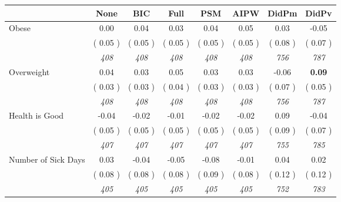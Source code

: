 \begin{tabular}{l c c c c c c c}
\toprule
 & None & BIC & Full & PSM & AIPW & DidPm & DidPv \\
\midrule
Obese &      0.00 &      0.04 &      0.03 &      0.04 &      0.05 &      0.03 &     -0.05 \\
& (     0.05 ) & (     0.05 ) & (     0.05 ) & (     0.05 ) & (     0.05 ) & (     0.08 ) & (     0.07 ) \\
& \textit{ 408 } & \textit{ 408 } & \textit{ 408 } & \textit{ 408 } & \textit{ 408 } & \textit{ 756 } & \textit{ 787 } \\
Overweight &      0.04 &      0.03 &      0.05 &      0.03 &      0.03 &     -0.06 & \textbf{      0.09 } \\
& (     0.03 ) & (     0.03 ) & (     0.04 ) & (     0.03 ) & (     0.03 ) & (     0.07 ) & (     0.05 ) \\
& \textit{ 408 } & \textit{ 408 } & \textit{ 408 } & \textit{ 408 } & \textit{ 408 } & \textit{ 756 } & \textit{ 787 } \\
Health is Good &     -0.04 &     -0.02 &     -0.01 &     -0.02 &     -0.02 &      0.09 &     -0.04 \\
& (     0.05 ) & (     0.05 ) & (     0.05 ) & (     0.05 ) & (     0.05 ) & (     0.09 ) & (     0.07 ) \\
& \textit{ 407 } & \textit{ 407 } & \textit{ 407 } & \textit{ 407 } & \textit{ 407 } & \textit{ 755 } & \textit{ 785 } \\
Number of Sick Days &      0.03 &     -0.04 &     -0.05 &     -0.08 &     -0.01 &      0.04 &      0.02 \\
& (     0.08 ) & (     0.08 ) & (     0.08 ) & (     0.09 ) & (     0.08 ) & (     0.12 ) & (     0.12 ) \\
& \textit{ 405 } & \textit{ 405 } & \textit{ 405 } & \textit{ 405 } & \textit{ 405 } & \textit{ 752 } & \textit{ 783 } \\
\bottomrule
\end{tabular}
